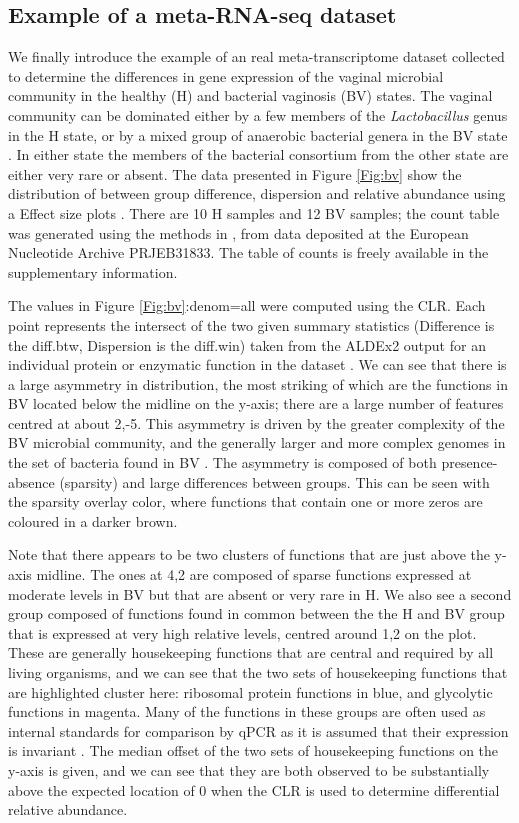 \documentclass{bmcart}
\begin{document}

\subsection*{Example of a meta-RNA-seq dataset}
 We finally introduce the example of an real meta-transcriptome dataset collected to determine the differences in gene expression of the vaginal microbial community in the healthy (H) and bacterial vaginosis (BV) states. The vaginal community can be dominated either by a few members of the \textit{Lactobacillus} genus in the H state, or by a mixed group of anaerobic bacterial genera in the BV state \cite{Ravel:2010}. In either state the members of the bacterial consortium from the other state are either very rare or absent. The data presented in Figure \ref{Fig:bv} show the distribution of between group difference, dispersion and relative abundance using a Effect size plots \cite{gloor:effect}. There are 10 H samples and 12 BV samples; the count table was generated using the methods in \cite{Macklaim:2018aa}, from data deposited at the European Nucleotide Archive PRJEB31833. The table of counts is freely available in the  supplementary information. 
 
The values in Figure \ref{Fig:bv}:denom=all were computed using the CLR. Each point represents the intersect of the two given summary statistics (Difference is the diff.btw, Dispersion is the diff.win) taken from the ALDEx2 output for an individual protein or enzymatic function in the dataset \cite{macklaim:2013}.  We can see that there is a large asymmetry in distribution, the most striking of which are the functions in BV located below the midline on the y-axis; there are a large number of features centred at about 2,-5. This asymmetry is driven by the greater complexity of the BV microbial community, and the generally larger and more complex genomes in the set of bacteria found in BV \cite{macklaim:2013}. The asymmetry is composed of both presence-absence (sparsity) and large differences between groups. This can be seen with the sparsity overlay color, where functions that contain one or more zeros are coloured in a darker brown. 

Note that there appears to be two clusters of functions that are just above the y-axis midline. The ones at 4,2 are composed of sparse functions expressed at moderate levels in BV but that are absent or very rare in H.  We also see a second group composed of functions found in common between the the H and BV group that is  expressed at very high relative levels, centred around 1,2 on the  plot. These are generally housekeeping functions that are central and required by all living organisms, and we can see that the two sets of housekeeping functions that are  highlighted cluster here: ribosomal protein functions in blue, and glycolytic functions in magenta. Many of the functions in these groups are often used as internal standards for comparison by qPCR as it is assumed that their expression is invariant \cite{Scott:2010}. The median offset of the two sets of housekeeping functions  on the y-axis is given, and we can see that they are both observed to be substantially above the expected location of 0 when the CLR is used to determine differential relative abundance.   
\end{document}

